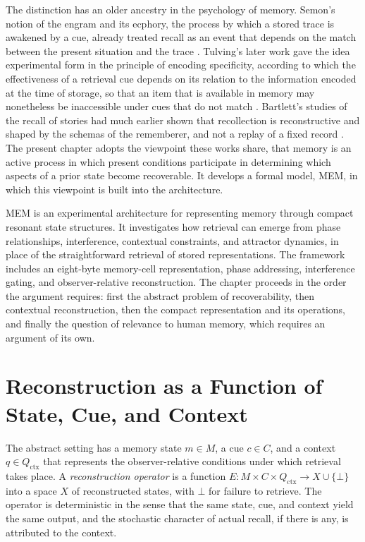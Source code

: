 \documentclass[11pt,twoside,openright]{book}
\theoremstyle{plain}
\theoremstyle{definition}
\theoremstyle{remark}
\newcommand{\memeight}{\mbox{MEM\textbar 8}}
\begin{document}
The distinction has an older ancestry in the psychology of memory. Semon's notion of the engram and its ecphory, the process by which a stored trace is awakened by a cue, already treated recall as an event that depends on the match between the present situation and the trace \cite{semon1904}. Tulving's later work gave the idea experimental form in the principle of encoding specificity, according to which the effectiveness of a retrieval cue depends on its relation to the information encoded at the time of storage, so that an item that is available in memory may nonetheless be inaccessible under cues that do not match \cite{tulving1973,tulving1983}. Bartlett's studies of the recall of stories had much earlier shown that recollection is reconstructive and shaped by the schemas of the rememberer, and not a replay of a fixed record \cite{bartlett1932}. The present chapter adopts the viewpoint these works share, that memory is an active process in which present conditions participate in determining which aspects of a prior state become recoverable. It develops a formal model, \memeight{}, in which this viewpoint is built into the architecture.

\memeight{} is an experimental architecture for representing memory through compact resonant state structures. It investigates how retrieval can emerge from phase relationships, interference, contextual constraints, and attractor dynamics, in place of the straightforward retrieval of stored representations. The framework includes an eight-byte memory-cell representation, phase addressing, interference gating, and observer-relative reconstruction. The chapter proceeds in the order the argument requires: first the abstract problem of recoverability, then contextual reconstruction, then the compact representation and its operations, and finally the question of relevance to human memory, which requires an argument of its own.

\section{Reconstruction as a Function of State, Cue, and Context}

The abstract setting has a memory state $m\in M$, a cue $c\in C$, and a context $q\in Q_{\mathrm{ctx}}$ that represents the observer-relative conditions under which retrieval takes place. A \emph{reconstruction operator} is a function $E:M\times C\times Q_{\mathrm{ctx}}\to X\cup\{\bot\}$ into a space $X$ of reconstructed states, with $\bot$ for failure to retrieve. The operator is deterministic in the sense that the same state, cue, and context yield the same output, and the stochastic character of actual recall, if there is any, is attributed to the context.
\end{document}
